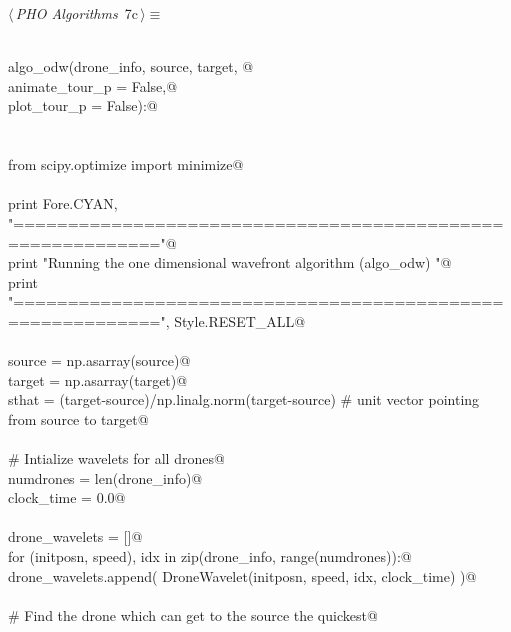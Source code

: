 \documentclass[12.0pt]{report}
\begin{document}
\begin{flushleft} \small\label{scrap4}\raggedright\small
{} $\langle\,${\itshape PHO Algorithms}\nobreak\ {\footnotesize {7c}}$\,\rangle\equiv$
\vspace{-1ex}
\begin{list}{}{} \item
\mbox{}\verb@@\\
\mbox{}\verb@def algo_odw(drone_info, source, target, @\\
\mbox{}\verb@             animate_tour_p = False,@\\
\mbox{}\verb@             plot_tour_p    = False):@\\
\mbox{}\verb@@\\
\mbox{}\verb@@\\
\mbox{}\verb@    from scipy.optimize import minimize@\\
\mbox{}\verb@@\\
\mbox{}\verb@    print Fore.CYAN, "\n==========================================================="@\\
\mbox{}\verb@    print            "Running the one dimensional wavefront algorithm (algo_odw) "@\\
\mbox{}\verb@    print            "===========================================================", Style.RESET_ALL@\\
\mbox{}\verb@@\\
\mbox{}\verb@    source = np.asarray(source)@\\
\mbox{}\verb@    target = np.asarray(target)@\\
\mbox{}\verb@    sthat  = (target-source)/np.linalg.norm(target-source) # unit vector pointing from source to target@\\
\mbox{}\verb@@\\
\mbox{}\verb@    # Intialize wavelets for all drones@\\
\mbox{}\verb@    numdrones  = len(drone_info)@\\
\mbox{}\verb@    clock_time = 0.0@\\
\mbox{}\verb@@\\
\mbox{}\verb@    drone_wavelets = []@\\
\mbox{}\verb@    for (initposn, speed), idx in zip(drone_info, range(numdrones)):@\\
\mbox{}\verb@         drone_wavelets.append(  DroneWavelet(initposn, speed, idx, clock_time)  )@\\
\mbox{}\verb@@\\
\mbox{}\verb@    # Find the drone which can get to the source the quickest@\\

\end{list}
\end{flushleft}
\end{document}
